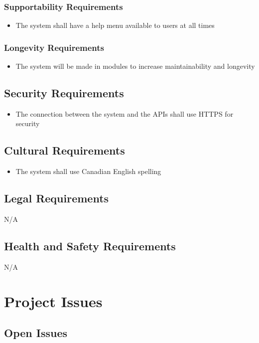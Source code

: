 \documentclass[12pt, titlepage]{article}
\begin{document}
\subsubsection{Supportability Requirements}
\begin{itemize}
    \item The system shall have a help menu available to users at all times
\end{itemize}
\subsubsection{Longevity Requirements}
\begin{itemize}
    \item The system will be made in modules to increase maintainability and longevity
\end{itemize}

\subsection{Security Requirements}
\begin{itemize}
    \item The connection between the system and the APIs shall use HTTPS for security
\end{itemize}

\subsection{Cultural Requirements}
\begin{itemize}
    \item The system shall use Canadian English spelling
\end{itemize}

\subsection{Legal Requirements}
N/A

\subsection{Health and Safety Requirements}
N/A

\section{Project Issues}

\subsection{Open Issues}
\end{document}

